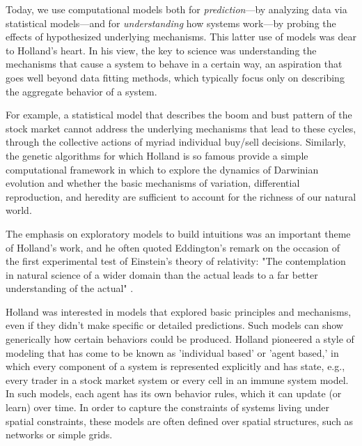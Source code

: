 \documentclass{sig-alternate}
\begin{document}

Today, we use computational models both for \emph{prediction}---by
analyzing data via statistical models---and for \emph{understanding}
how systems work---by probing the effects of hypothesized underlying
mechanisms.  This latter use of models was dear to Holland's heart.
In his view, the key to science was understanding the mechanisms that
cause a system to behave in a certain way, an aspiration that goes
well beyond data fitting methods, which typically focus only on
describing the aggregate behavior of a system.  

For example, a statistical model that describes the boom and bust
pattern of the stock market cannot address the underlying mechanisms
that lead to these cycles, through the collective actions of myriad
individual buy/sell decisions.  Similarly, the genetic algorithms for
which Holland is so famous provide a simple computational framework in
which to explore the dynamics of Darwinian evolution and whether the
basic mechanisms of variation, differential reproduction, and heredity
are sufficient to account for the richness of our natural world.  

The emphasis on exploratory models to build intuitions was an
important theme of Holland's work, and he often quoted Eddington's
remark on the occasion of the first experimental test of Einstein's
theory of relativity: "The contemplation in natural science of a wider
domain than the actual leads to a far better understanding of the
actual" \cite{Eddington1927}.

Holland was interested in models that explored basic principles and
mechanisms, even if they didn't make specific or detailed predictions.
Such models can show generically how certain behaviors could be produced.
Holland pioneered a style of modeling that has come to be known as
'individual based' or 'agent based,' in which every component of a
system is represented explicitly and has state, e.g., every trader in
a stock market system or every cell in an immune system model.  In
such models, each agent has its own behavior rules, which it can
update (or learn) over time.  In order to capture the constraints of
systems living under spatial constraints, these models are often
defined over spatial structures, such as networks or simple grids.  
\end{document}
